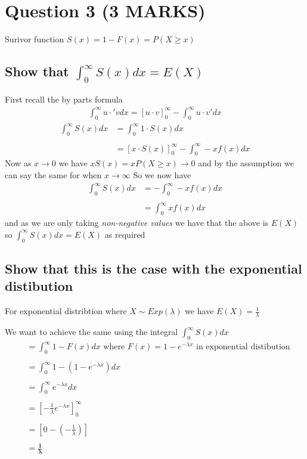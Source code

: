 \documentclass[11pt]{article}
\begin{document}
\section{Question 3 (3 MARKS)}
Surivor function $S(x) = 1 - F(x) = P(X \geq x)$
\subsection{Show that $\int_{0}^{\infty}S(x) dx = E(X)$}
First recall the by parts formula
\begin{align*}
    \int_{0}^{\infty} u\cdot'v dx = [u\cdot v]_{0}^{\infty} - \int_{0}^{\infty} u\cdot v' dx
\end{align*}
\begin{align*}
    \int_{0}^{\infty}S(x) dx &= \int_{0}^{\infty}1 \cdot S(x) dx \\ \\
                             &= [x\cdot S(x)]_{0}^{\infty}-\int_{0}^{\infty}-xf(x) dx
\end{align*}
Now as $x \to 0$  we have $xS(x)=xP(X\geq x) \to 0$ and by the assumption we can say the same for when $x \to \infty$ So we now have
\begin{align*}
    \int_{0}^{\infty}S(x) dx &= -\int_{0}^{\infty}-xf(x) dx \\ \\
                             &= \int_{0}^{\infty}xf(x) dx
\end{align*}
and as we are only taking \emph{non-negative values} we have that the above is $E(X)$ so $\int_{0}^{\infty}S(x) dx = E(X)$ as required
\subsection{Show that this is the case with the exponential distibution }
For exponential distribtion where $X \sim Exp(\lambda)$ we have $E(X) = \frac{1}{\lambda}$

We want to achieve the same using the integral $\int_{0}^{\infty} S(x) dx$
\begin{align*}
    &= \int_{0}^{\infty} 1-F(x) dx \text{  where $F(x) = 1 -e^{-\lambda x}$ in exponential distibution} \\ \\
    &= \int_{0}^{\infty} 1-(1-e^{-\lambda x})dx  \\ \\
    &= \int_{0}^{\infty} e^{-\lambda x} dx \\ \\
    &= \left[-\frac{1}{\lambda} e^{-\lambda x} \right]_{0}^{\infty} \\ \\
    &= \left[0 - (-\frac{1}{\lambda}) \right] \\ \\
    &= \boxed{\bm{\frac{1}{\lambda}}}
\end{align*}
\end{document}
